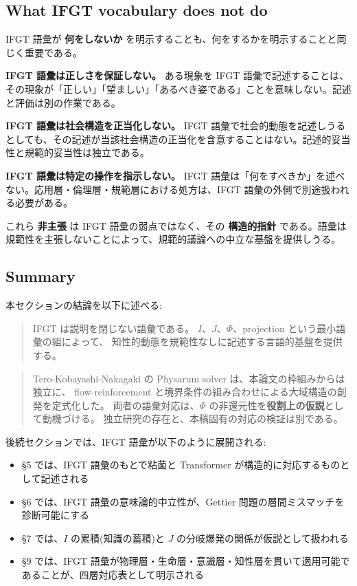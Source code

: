 \subsection{What IFGT vocabulary does not do}


IFGT 語彙が \textbf{何をしないか} を明示することも、何をするかを明示することと同じく重要である。

\textbf{IFGT 語彙は正しさを保証しない。} ある現象を IFGT 語彙で記述することは、その現象が「正しい」「望ましい」「あるべき姿である」ことを意味しない。記述と評価は別の作業である。

\textbf{IFGT 語彙は社会構造を正当化しない。} IFGT 語彙で社会的動態を記述しうるとしても、その記述が当該社会構造の正当化を含意することはない。記述的妥当性と規範的妥当性は独立である。

\textbf{IFGT 語彙は特定の操作を指示しない。} IFGT 語彙は「何をすべきか」を述べない。応用層・倫理層・規範層における処方は、IFGT 語彙の外側で別途扱われる必要がある。

これら \textbf{非主張} は IFGT 語彙の弱点ではなく、その \textbf{構造的指針} である。語彙は規範性を主張しないことによって、規範的議論への中立な基盤を提供しうる。

\subsection{Summary}


本セクションの結論を以下に述べる:

\begin{quote}
IFGT は説明を閉じない語彙である。
$I$、$J$、$\Phi$、projection という最小語彙の組によって、
知性的動態を規範性なしに記述する言語的基盤を提供する。
\end{quote}

\begin{quote}
Tero-Kobayashi-Nakagaki の Physarum solver は、本論文の枠組みからは独立に、
flow-reinforcement と境界条件の組み合わせによる大域構造の創発を定式化した。
両者の語彙対応は、$\Phi$ の非還元性を\textbf{役割上の仮説}として動機づける。
独立研究の存在と、本稿固有の対応の検証は別である。
\end{quote}

後続セクションでは、IFGT 語彙が以下のように展開される:

\begin{itemize}
\item \S{}5 では、IFGT 語彙のもとで粘菌と Transformer が構造的に対応するものとして記述される
\item \S{}6 では、IFGT 語彙の意味論的中立性が、Gettier 問題の層間ミスマッチを診断可能にする
\item \S{}7 では、$I$ の累積(知識の蓄積)と $J$ の分岐爆発の関係が仮説として扱われる
\item \S{}9 では、IFGT 語彙が物理層・生命層・意識層・知性層を貫いて適用可能であることが、四層対応表として明示される
\end{itemize}
